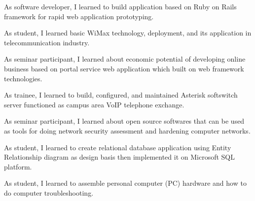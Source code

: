 \documentclass[10pt, a4paper]{moderncv}
\begin{document}
{
    \begin{scriptsize}
        As software developer, I learned to build application based on Ruby on Rails framework for rapid web application prototyping.
    \end{scriptsize}
}
{
    \begin{scriptsize}
        As student, I learned basic WiMax technology, deployment, and its application in telecommunication industry.
    \end{scriptsize}
}
{
    \begin{scriptsize}
        As seminar participant, I learned about economic potential of developing online business based on portal service web application which built
        on web framework technologies.
    \end{scriptsize}
}
{
    \begin{scriptsize}
        As trainee, I learned to build, configured, and maintained Asterisk softswitch server functioned as campus area VoIP telephone exchange.
    \end{scriptsize}
}
{
    \begin{scriptsize}
        As seminar participant, I learned about open source softwares that can be used as tools for doing network security assessment and hardening
        computer networks.
    \end{scriptsize}
}
{
    \begin{scriptsize}
        As student, I learned to create relational database application using Entity Relationship diagram as design basis then implemented it
        on Microsoft SQL platform.
    \end{scriptsize}
}
{
    \begin{scriptsize}
        As student, I learned to assemble personal computer (PC) hardware and how to do computer troubleshooting.
    \end{scriptsize}
}
\end{document}
